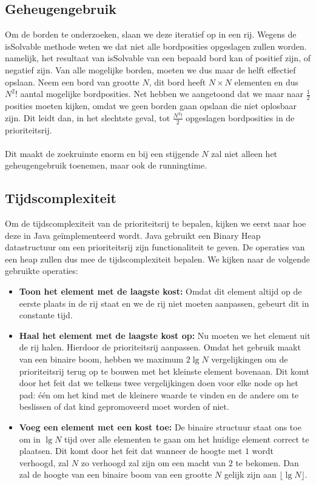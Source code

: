 \documentclass[a4paper]{article}
\numberwithin{equation}{section}
\begin{document}
            
    \pagebreak

        \subsection{Geheugengebruik}
        Om de borden te onderzoeken, slaan we deze iteratief op in een rij. Wegens de isSolvable methode weten we dat niet alle bordposities opgeslagen zullen worden. 
        namelijk, het resultaat van isSolvable van een bepaald bord kan of positief zijn, of negatief zijn. Van alle mogelijke borden, moeten we dus maar de helft effectief opslaan.
        Neem een bord van grootte $N$, dit bord heeft $N \times N$ elementen en dus $N^2!$ aantal mogelijke bordposities. Net hebben we aangetoond dat we maar naar $\frac{1}{2}$ posities moeten kijken, omdat we geen borden gaan opslaan die niet oplosbaar zijn.
        Dit leidt dan, in het slechtste geval, tot $\frac{N^2!}{2}$ opgeslagen bordposities in de prioriteitsrij.
        \\
        \\Dit maakt de zoekruimte enorm en bij een stijgende $N$ zal niet alleen het geheugengebruik toenemen, maar ook de runningtime.

        \subsection{Tijdscomplexiteit}
        Om de tijdscomplexiteit van de prioriteitsrij te bepalen, kijken we eerst naar hoe deze in Java ge\"implementeerd wordt.
        Java gebruikt een Binary Heap datastructuur om een prioriteitsrij zijn functionaliteit te geven. De operaties van een heap zullen dus mee de tijdscomplexiteit bepalen.
        We kijken naar de volgende gebruikte operaties:
        \begin{itemize}
            \item \textbf{Toon het element met de laagste kost:} Omdat dit element altijd op de eerste plaats in de rij staat en we de rij niet moeten aanpassen, gebeurt dit in constante tijd.
            \item \textbf{Haal het element met de laagste kost op:} Nu moeten we het element uit de rij halen. Hierdoor de prioriteitsrij aanpassen. Omdat het gebruik maakt van een binaire boom, hebben we maximum $2 \lg N$ vergelijkingen om de prioriteitsrij terug op te bouwen met het kleinste element bovenaan. Dit komt door het feit dat we telkens twee vergelijkingen doen voor elke node op het pad: \'e\'en om het kind met de kleinere waarde te vinden en de andere om te beslissen of dat kind gepromoveerd moet worden of niet.
            \item \textbf{Voeg een element met een kost toe:} De binaire structuur staat ons toe om in $\lg N$ tijd over alle elementen te gaan om het huidige element correct te plaatsen. Dit komt door het feit dat wanneer de hoogte met $1$ wordt verhoogd, zal $N$ zo verhoogd zal zijn om een macht van $2$ te bekomen. Dan zal de hoogte van een binaire boom van een grootte $N$ gelijk zijn aan $\lfloor \lg N \rfloor$.
        \end{itemize}
        
\end{document}
